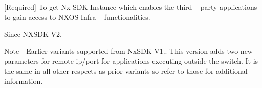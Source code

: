 \mbox{[}Required\mbox{]} To get Nx S\+DK Instance which enables the third ~\newline
 party applications to gain access to N\+X\+OS Infra ~\newline
 functionalities. ~\newline
\begin{DoxySince}{Since}
N\+X\+S\+DK V2. ~\newline
 
\end{DoxySince}
\begin{DoxyNote}{Note}
-\/ Earlier variants supported from Nx\+S\+DK V1.. This version adds two new parameters for remote ip/port for applications executing outside the switch. It is the same in all other respects as prior variants so refer to those for additional information.
\end{DoxyNote}

